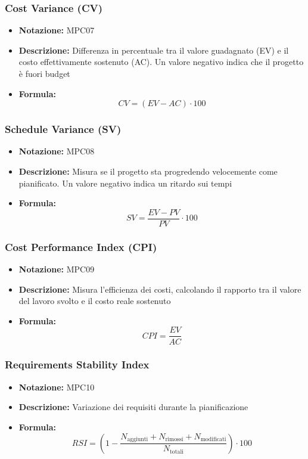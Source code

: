 \documentclass[a4paper,12pt]{article}
\begin{document}
        \subsubsection{Cost Variance (CV)}
            \begin{itemize}
                \item \textbf{Notazione:} MPC07
                \item \textbf{Descrizione:} Differenza in percentuale tra il valore guadagnato (EV) e il costo effettivamente sostenuto (AC). Un valore negativo indica che il progetto è fuori budget
                \item \textbf{Formula:} 
                \[ CV = (EV - AC) \cdot 100 \]
            \end{itemize}

        \subsubsection{Schedule Variance (SV)}
            \begin{itemize}
                \item \textbf{Notazione:} MPC08
                \item \textbf{Descrizione:} Misura se il progetto sta progredendo velocemente come pianificato. Un valore negativo indica un ritardo sui tempi
                \item \textbf{Formula:} 
                \[ SV = \frac{EV - PV}{PV} \cdot 100 \]
            \end{itemize}

        \subsubsection{Cost Performance Index (CPI)}
            \begin{itemize}
                \item \textbf{Notazione:} MPC09
                \item \textbf{Descrizione:} Misura l'efficienza dei costi, calcolando il rapporto tra il valore del lavoro svolto e il costo reale sostenuto
                \item \textbf{Formula:} 
                \[ CPI = \frac{EV}{AC} \]
            \end{itemize}

        \subsubsection{Requirements Stability Index}
            \begin{itemize}
                \item \textbf{Notazione:} MPC10
                \item \textbf{Descrizione:} Variazione dei requisiti durante la pianificazione
                \item \textbf{Formula:} 
                \[ RSI = \left( 1 - \frac{N_\text{aggiunti} + N_\text{rimossi} + N_\text{modificati}}{N_\text{totali}} \right) \cdot 100 \]
            \end{itemize}
\end{document}
